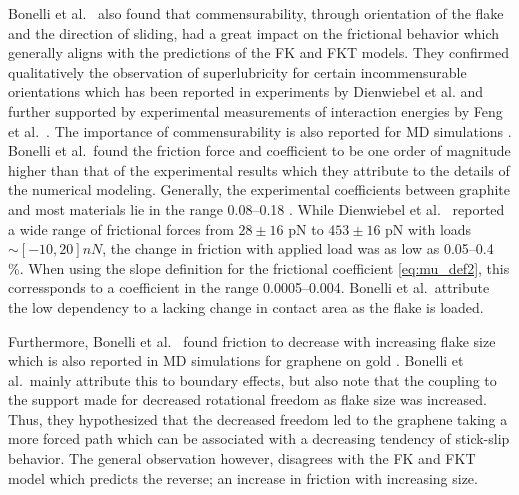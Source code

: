 
Bonelli et al.\ \cite{bonelli_atomistic_2009} also found that commensurability,
through orientation of the flake and the direction of sliding, had a great
impact on the frictional behavior which generally aligns with the predictions of
the \acrshort{FK} and \acrshort{FKT} models. They confirmed qualitatively the
observation of superlubricity for certain incommensurable orientations which has
been reported in experiments by Dienwiebel et al.\cite{DIENWIEBEL2005197} and
further supported by experimental measurements of interaction energies by Feng
et al.\ \cite{feng_superlubric_2013}. The importance of commensurability is also
reported for \acrshort{MD} simulations \cite{ma12091425, zhu_study_2018,
Wijn_2011}. Bonelli et al.\ found the friction force and coefficient to be one
order of magnitude higher than that of the experimental results which they
attribute to the details of the numerical modeling. Generally, the experimental
coefficients between graphite and most materials lie in the range 0.08--0.18
\cite{DIENWIEBEL2005197}. While Dienwiebel et al.\ \cite{DIENWIEBEL2005197}
reported a wide range of frictional forces from $28 \pm 16$ pN to $453 \pm 16$
pN with loads $\sim [-10, 20] nN$, the change in friction with applied load was
as low as 0.05--0.4 \%. When using the slope definition for the frictional
coefficient \cref{eq:mu_def2}, this corressponds to a coefficient in the range
0.0005--0.004. Bonelli et al.\ attribute the low dependency to a lacking change in contact area as the flake is loaded. 

Furthermore, Bonelli et al.\ \cite{bonelli_atomistic_2009} found friction to decrease with increasing flake size which is also reported in \acrshort{MD} simulations for graphene on gold \cite{zhu_study_2018}. Bonelli et al.\ mainly attribute this to boundary effects, but also note that the coupling to the support made for decreased rotational freedom as flake size was increased. Thus, they hypothesized that the decreased freedom led to the graphene taking a more forced path which can be associated with a decreasing tendency of stick-slip behavior. The general observation however, disagrees with the \acrshort{FK} and \acrshort{FKT} model which predicts the reverse; an increase in friction with increasing size. 


